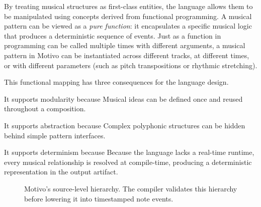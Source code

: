By treating musical structures as first-class entities, the language allows them to be manipulated using concepts
derived from functional programming.
A musical pattern can be viewed as a \textit{pure function}: it encapsulates a specific musical logic that produces a
deterministic sequence of events.
Just as a function in programming can be called multiple times with different arguments, a musical pattern in
Motivo can be instantiated across different tracks, at different times, or with different parameters (such as
pitch transpositions or rhythmic stretching).

This functional mapping has three consequences for the language design.

It supports modularity because Musical ideas can be defined once and reused throughout a composition.

It supports abstraction because Complex polyphonic structures can be hidden behind simple pattern interfaces.

It supports determinism because Because the language lacks a real-time runtime, every musical relationship is
resolved at compile-time, producing a deterministic representation in the output artifact.

\begin{figure}[htbp]
  \centering
  \caption{Motivo's source-level hierarchy.
  The compiler validates this hierarchy before lowering it into timestamped note events.}\label{fig:motivo-hierarchy}
\end{figure}
